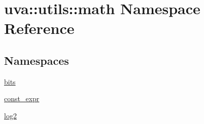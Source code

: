 \hypertarget{namespaceuva_1_1utils_1_1math}{}\section{uva\+:\+:utils\+:\+:math Namespace Reference}
\label{namespaceuva_1_1utils_1_1math}
\subsection*{Namespaces}
\begin{DoxyCompactItemize}
\item 
 \hyperlink{namespaceuva_1_1utils_1_1math_1_1bits}{bits}
\item 
 \hyperlink{namespaceuva_1_1utils_1_1math_1_1const__expr}{const\+\_\+expr}
\item 
 \hyperlink{namespaceuva_1_1utils_1_1math_1_1log2}{log2}
\end{DoxyCompactItemize}
